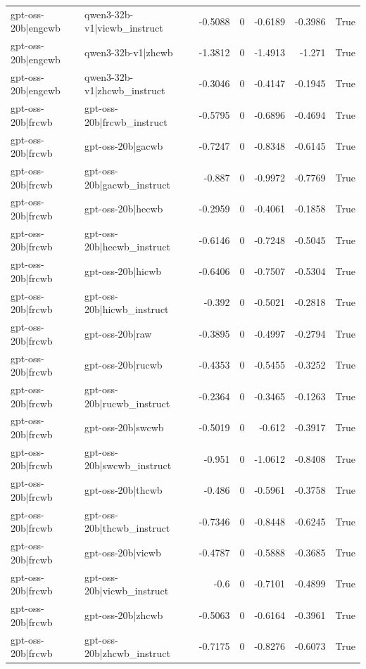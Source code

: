 \begin{table}
\begin{tabular}{l l r r r r l}
gpt-oss-20b|engcwb & qwen3-32b-v1|vicwb_instruct & -0.5088 & 0 & -0.6189 & -0.3986 & True \\
gpt-oss-20b|engcwb & qwen3-32b-v1|zhcwb & -1.3812 & 0 & -1.4913 & -1.271 & True \\
gpt-oss-20b|engcwb & qwen3-32b-v1|zhcwb_instruct & -0.3046 & 0 & -0.4147 & -0.1945 & True \\
gpt-oss-20b|frcwb & gpt-oss-20b|frcwb_instruct & -0.5795 & 0 & -0.6896 & -0.4694 & True \\
gpt-oss-20b|frcwb & gpt-oss-20b|gacwb & -0.7247 & 0 & -0.8348 & -0.6145 & True \\
gpt-oss-20b|frcwb & gpt-oss-20b|gacwb_instruct & -0.887 & 0 & -0.9972 & -0.7769 & True \\
gpt-oss-20b|frcwb & gpt-oss-20b|hecwb & -0.2959 & 0 & -0.4061 & -0.1858 & True \\
gpt-oss-20b|frcwb & gpt-oss-20b|hecwb_instruct & -0.6146 & 0 & -0.7248 & -0.5045 & True \\
gpt-oss-20b|frcwb & gpt-oss-20b|hicwb & -0.6406 & 0 & -0.7507 & -0.5304 & True \\
gpt-oss-20b|frcwb & gpt-oss-20b|hicwb_instruct & -0.392 & 0 & -0.5021 & -0.2818 & True \\
gpt-oss-20b|frcwb & gpt-oss-20b|raw & -0.3895 & 0 & -0.4997 & -0.2794 & True \\
gpt-oss-20b|frcwb & gpt-oss-20b|rucwb & -0.4353 & 0 & -0.5455 & -0.3252 & True \\
gpt-oss-20b|frcwb & gpt-oss-20b|rucwb_instruct & -0.2364 & 0 & -0.3465 & -0.1263 & True \\
gpt-oss-20b|frcwb & gpt-oss-20b|swcwb & -0.5019 & 0 & -0.612 & -0.3917 & True \\
gpt-oss-20b|frcwb & gpt-oss-20b|swcwb_instruct & -0.951 & 0 & -1.0612 & -0.8408 & True \\
gpt-oss-20b|frcwb & gpt-oss-20b|thcwb & -0.486 & 0 & -0.5961 & -0.3758 & True \\
gpt-oss-20b|frcwb & gpt-oss-20b|thcwb_instruct & -0.7346 & 0 & -0.8448 & -0.6245 & True \\
gpt-oss-20b|frcwb & gpt-oss-20b|vicwb & -0.4787 & 0 & -0.5888 & -0.3685 & True \\
gpt-oss-20b|frcwb & gpt-oss-20b|vicwb_instruct & -0.6 & 0 & -0.7101 & -0.4899 & True \\
gpt-oss-20b|frcwb & gpt-oss-20b|zhcwb & -0.5063 & 0 & -0.6164 & -0.3961 & True \\
gpt-oss-20b|frcwb & gpt-oss-20b|zhcwb_instruct & -0.7175 & 0 & -0.8276 & -0.6073 & True \\

\end{tabular}
\end{table}
